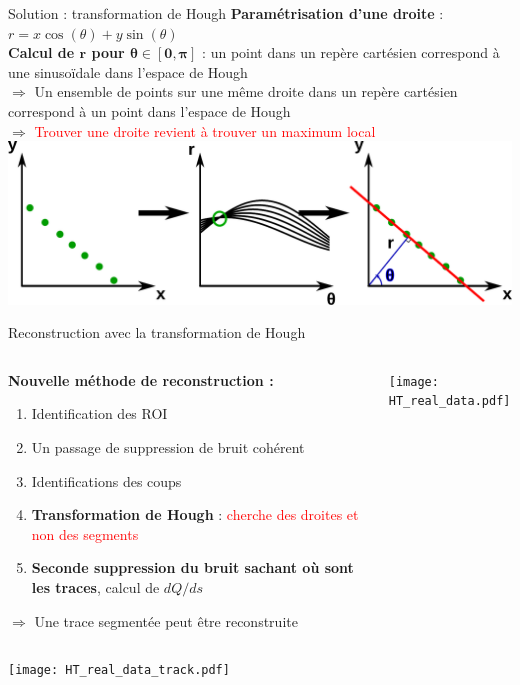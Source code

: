     \begin{frame}{Solution : transformation de Hough}
        \textbf{Paramétrisation d'une droite }: $r=x\cos(\theta)+y\sin(\theta)$\\
        \textbf{Calcul de $\boldsymbol{r}$ pour $\boldsymbol{\theta\in[0,\pi]}$} : un point dans un repère cartésien correspond à une sinusoïdale dans l'espace de Hough\\
        $\Rightarrow$ Un ensemble de points sur une même droite dans un repère cartésien correspond à un point dans l'espace de Hough\\
        $\Rightarrow$ \textcolor{red}{Trouver une droite revient à trouver un maximum local}\\\vfill
        \includegraphics[width=\textwidth]{./pictures/HT.pdf}
    \end{frame}

    \begin{frame}{Reconstruction avec la transformation de Hough}
        \begin{scriptsize}
            \begin{columns}
                \begin{column}{0.5\textwidth}
                    \textbf{Nouvelle méthode de reconstruction :}
                    \begin{enumerate}
                        \item Identification des ROI
                        \item Un passage de suppression de bruit cohérent
                        \item Identifications des coups
                        \item \textbf{Transformation de Hough} : \textcolor{red}{cherche des droites et non des segments}
                        \item \textbf{Seconde suppression du bruit sachant où sont les traces}, calcul de $dQ/ds$
                    \end{enumerate}
                    $\Rightarrow$ Une trace segmentée peut être reconstruite
                \end{column}
                \begin{column}{0.5\textwidth}
                    \centering \texttt{[image: HT\_real\_data.pdf]}
                \end{column}
            \end{columns}
            \begin{center} \texttt{[image: HT\_real\_data\_track.pdf]} \end{center}
        \end{scriptsize}
    \end{frame}

